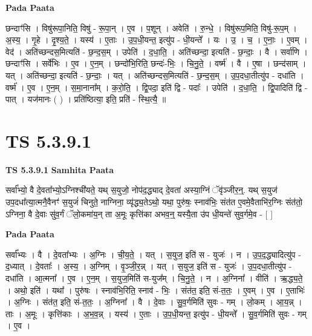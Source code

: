 \documentclass[17pt]{extarticle}
\begin{document}
\textbf{Pada Paata} \newline

छन्दाꣳ॑सि । विषु॑रूपा॒निति॒ विषु॑ - रू॒पा॒न् । ए॒व । प॒शून् । अवेति॑ । रु॒न्धे॒ । विषु॑रूप॒मिति॒ विषु॑-रू॒प॒म् । अ॒स्य॒ । गृ॒हे । दृ॒श्य॒ते॒ । यस्य॑ । ए॒ताः । उ॒प॒धी॒यन्त॒ इत्यु॑प - धी॒यन्ते᳚ । यः । उ॒ । च॒ । ए॒नाः॒ । ए॒वम् । वेद॑ । अति॑च्छन्दस॒मित्यति॑ - छ॒न्द॒स॒म् । उपेति॑ । द॒धा॒ति॒ । अति॑च्छन्दा॒ इत्यति॑ - छ॒न्दाः॒ । वै । सर्वा॑णि । छन्दाꣳ॑सि । सर्वे॑भिः । ए॒व । ए॒न॒म् । छन्दो॑भि॒रिति॒ छन्दः॑-भिः॒ । चि॒नु॒ते॒ । वर्ष्म॑ । वै । ए॒षा । छन्द॑साम् । यत् । अति॑च्छन्दा॒ इत्यति॑ - छ॒न्दाः॒ । यत् । अति॑च्छन्दस॒मित्यति॑ - छ॒न्द॒स॒म् । उ॒प॒दधा॒तीत्यु॑प - दधा॑ति । वर्ष्म॑ । ए॒व । ए॒न॒म् । स॒मा॒नाना᳚म् । क॒रो॒ति॒ । द्वि॒पदा॒ इति॑ द्वि - पदाः᳚ । उपेति॑ । द॒धा॒ति॒ । द्वि॒पादिति॑ द्वि - पात् । यज॑मानः ( ) । प्रति॑ष्ठित्या॒ इति॒ प्रति॑ - स्थि॒त्यै॒ ॥  \newline





\section{ TS 5.3.9.1 }

\textbf{TS 5.3.9.1 } \newline
\textbf{Samhita Paata} \newline

सर्वा᳚भ्यो॒ वै दे॒वता᳚भ्यो॒ऽग्निश्ची॑यते॒ यथ् स॒युजो॒ नोप॑द॒द्ध्याद् दे॒वता॑ अस्या॒ग्निं ॅवृ॑ञ्जीर॒न्॒. यथ् स॒युज॑ उप॒दधा᳚त्या॒त्मनै॒वैनꣳ॑ स॒युजं॑ चिनुते॒ नाग्निना॒ व्यृ॑द्ध्य॒तेऽथो॒ यथा॒ पुरु॑षः॒ स्नाव॑भिः॒ संत॑त ए॒वमे॒वैताभि॑र॒ग्निः संत॑तो॒ ऽग्निना॒ वै दे॒वाः सु॑व॒र्गं ॅलो॒कमा॑य॒न् ता अ॒मूः कृत्ति॑का अभव॒न्॒ यस्यै॒ता उ॑प धी॒यन्ते॑ सुव॒र्गमे॒व - [  ] \newline

\textbf{Pada Paata} \newline

सर्वा᳚भ्यः । वै । दे॒वता᳚भ्यः । अ॒ग्निः । ची॒य॒ते॒ । यत् । स॒युज॒ इति॑ स - युजः॑ । न । उ॒प॒द॒द्ध्यादित्यु॑प - द॒ध्यात् । दे॒वताः᳚ । अ॒स्य॒ । अ॒ग्निम् । वृ॒ञ्जी॒र॒न्न् । यत् । स॒युज॒ इति॑ स - युजः॑ । उ॒प॒दधा॒तीत्यु॑प - दधा॑ति । आ॒त्मना᳚ । ए॒व । ए॒न॒म् । स॒युज॒मिति॑ स-युज᳚म् । चि॒नु॒ते॒ । न । अ॒ग्निना᳚ । वीति॑ । ऋ॒द्ध्य॒ते॒ । अथो॒ इति॑ । यथा᳚ । पुरु॑षः । स्नाव॑भि॒रिति॒ स्नाव॑ - भिः॒ । संत॑त॒ इति॒ सं-त॒तः॒ । ए॒वम् । ए॒व । ए॒ताभिः॑ । अ॒ग्निः । संत॑त॒ इति॒ सं-त॒तः॒ । अ॒ग्निना᳚ । वै । दे॒वाः । सु॒व॒र्गमिति॑ सुवः - गम् । लो॒कम् । आ॒य॒न्न् । ताः । अ॒मूः । कृत्ति॑काः । अ॒भ॒व॒न्न् । यस्य॑ । ए॒ताः । उ॒प॒धी॒यन्त॒ इत्यु॑प - धी॒यन्ते᳚ । सु॒व॒र्गमिति॑ सुवः - गम् । ए॒व ।  \newline
\end{document}
